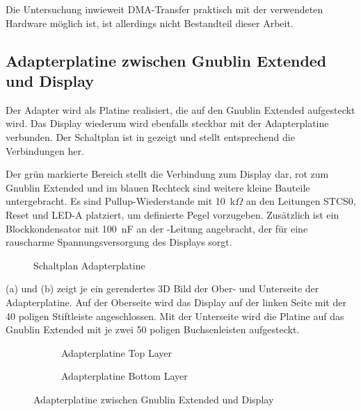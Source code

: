 Die Untersuchung inwieweit DMA-Transfer praktisch mit der verwendeten Hardware möglich ist, ist allerdings nicht Bestandteil dieser Arbeit. 

\newpage
\subsection{Adapterplatine zwischen Gnublin Extended und Display}
Der Adapter wird als Platine realisiert, die auf den Gnublin Extended aufgesteckt wird. Das Display wiederum wird ebenfalls steckbar mit der Adapterplatine verbunden. Der Schaltplan ist in  gezeigt und stellt entsprechend  die Verbindungen her.

Der grün markierte Bereich stellt die Verbindung zum Display dar, rot zum Gnublin Extended und im blauen Rechteck sind weitere kleine Bauteile untergebracht. Es sind Pullup-Wiederstande mit 10~k$\Omega$ an den Leitungen STCS0, Reset und LED-A platziert, um definierte Pegel vorzugeben. Zusätzlich ist ein Blockkondensator mit 100~nF an der -Leitung angebracht, der für eine rauscharme Spannungsversorgung des Displays sorgt.

\begin{figure}[tbph]
	\centering
{}
	\caption{Schaltplan Adapterplatine}
	\label{fig:adapterplatine_sch}
\end{figure}
\newpage

 (a) und (b) zeigt je ein gerendertes 3D Bild der Ober- und Unterseite der Adapterplatine. Auf der Oberseite wird das Display auf der linken Seite mit der 40 poligen Stiftleiste angeschlossen. Mit der Unterseite wird die Platine auf das Gnublin Extended mit je zwei 50 poligen Buchsenleisten aufgesteckt.

\begin{figure}
        \begin{center}
        \begin{subfigure}[htp]{0.8\textwidth}
                \caption{Adapterplatine Top Layer}
                \label{fig:adapter_top}
        \end{subfigure}

        \begin{subfigure}[htp]{0.8\textwidth}
                             				\caption{Adapterplatine Bottom Layer}
                \label{fig:adapter_bot}
        \end{subfigure}
		\end{center}
        \caption{Adapterplatine zwischen Gnublin Extended und Display}\label{fig:adapterplatine}
\end{figure}

